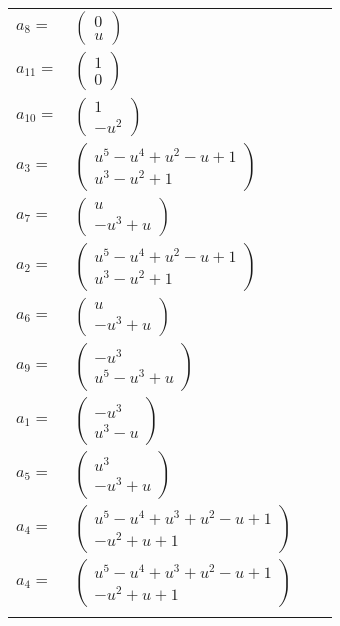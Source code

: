 \documentclass[1p]{elsarticle_modified}
\theoremstyle{definition}
\begin{document}
\begin{tabular}{m{7pt} m{180pt} m{7pt} m{180pt} }
\flushright $a_{8}=$&$\begin{pmatrix}0\\u\end{pmatrix}$ \\
\flushright $a_{11}=$&$\begin{pmatrix}1\\0\end{pmatrix}$ \\
\flushright $a_{10}=$&$\begin{pmatrix}1\\- u^2\end{pmatrix}$ \\
\flushright $a_{3}=$&$\begin{pmatrix}u^5- u^4+u^2- u+1\\u^3- u^2+1\end{pmatrix}$ \\
\flushright $a_{7}=$&$\begin{pmatrix}u\\- u^3+u\end{pmatrix}$ \\
\flushright $a_{2}=$&$\begin{pmatrix}u^5- u^4+u^2- u+1\\u^3- u^2+1\end{pmatrix}$ \\
\flushright $a_{6}=$&$\begin{pmatrix}u\\- u^3+u\end{pmatrix}$ \\
\flushright $a_{9}=$&$\begin{pmatrix}- u^3\\u^5- u^3+u\end{pmatrix}$ \\
\flushright $a_{1}=$&$\begin{pmatrix}- u^3\\u^3- u\end{pmatrix}$ \\
\flushright $a_{5}=$&$\begin{pmatrix}u^3\\- u^3+u\end{pmatrix}$ \\
\flushright $a_{4}=$&$\begin{pmatrix}u^5- u^4+u^3+u^2- u+1\\- u^2+u+1\end{pmatrix}$\\ \flushright $a_{4}=$&$\begin{pmatrix}u^5- u^4+u^3+u^2- u+1\\- u^2+u+1\end{pmatrix}$\\&\end{tabular}
\end{document}

